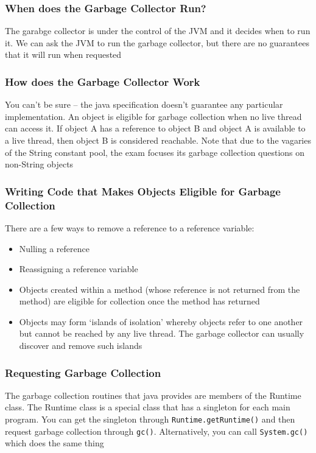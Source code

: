 \subsubsection{When does the Garbage Collector Run?}
The garabge collector is under the control of the JVM and it decides when to 
run it. We can ask the JVM to run the garbage collector, but there are no 
guarantees that it will run when requested

\subsubsection{How does the Garbage Collector Work}
You can't be sure -- the java specification doesn't guarantee any particular 
implementation. An object is eligible for garbage collection when no live 
thread can access it. If object A has a reference to object B and object A is 
available to a live thread, then object B is considered reachable. Note that 
due to the vagaries of the String constant pool, the exam focuses its garbage 
collection questions on non-String objects

\subsubsection{Writing Code that Makes Objects Eligible for Garbage Collection}
There are a few ways to remove a reference to a reference variable:
\begin{itemize}
    \item Nulling a reference
    \item Reassigning a reference variable
    \item Objects created within a method (whose reference is not returned from 
    the method) are eligible for collection once the method has returned
    \item Objects may form `islands of isolation' whereby objects refer to one 
    another but cannot be reached by any live thread. The garbage collector can 
    usually discover and remove such islands
\end{itemize}

\subsubsection{Requesting Garbage Collection}
The garbage collection routines that java provides are members of the Runtime 
class. The Runtime class is a special class that has a singleton for each main 
program. You can get the singleton through \verb#Runtime.getRuntime()# and then 
request garbage collection through \verb#gc()#. Alternatively, you can call 
\verb#System.gc()# which does the same thing


